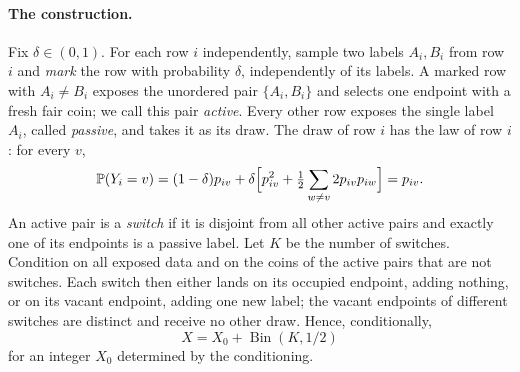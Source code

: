\documentclass[11pt,a4paper]{article}
\theoremstyle{definition}\newtheorem{remark}[theorem]{Remark}\newtheorem{conjecture}{Conjecture}
\begin{document}
\paragraph{The construction.} Fix $\delta\in(0,1)$. For each row $i$ independently, sample two labels $A_i,B_i$ from row $i$ and \emph{mark} the row with probability $\delta$, independently of its labels. A marked row with $A_i\ne B_i$ exposes the unordered pair $\{A_i,B_i\}$ and selects one endpoint with a fresh fair coin; we call this pair \emph{active}. Every other row exposes the single label $A_i$, called \emph{passive}, and takes it as its draw. The draw of row $i$ has the law of row $i$: for every $v$,
\[
\mathbb P(Y_i=v)=(1-\delta)p_{iv}+\delta\Big[p_{iv}^2+\tfrac12\sum_{w\ne v}2p_{iv}p_{iw}\Big]=p_{iv}.
\]
An active pair is a \emph{switch} if it is disjoint from all other active pairs and exactly one of its endpoints is a passive label. Let $K$ be the number of switches. Condition on all exposed data and on the coins of the active pairs that are not switches. Each switch then either lands on its occupied endpoint, adding nothing, or on its vacant endpoint, adding one new label; the vacant endpoints of different switches are distinct and receive no other draw. Hence, conditionally,
\begin{equation}
X=X_0+\operatorname{Bin}(K,1/2)\label{eq:bin}
\end{equation}
for an integer $X_0$ determined by the conditioning.
\end{document}

